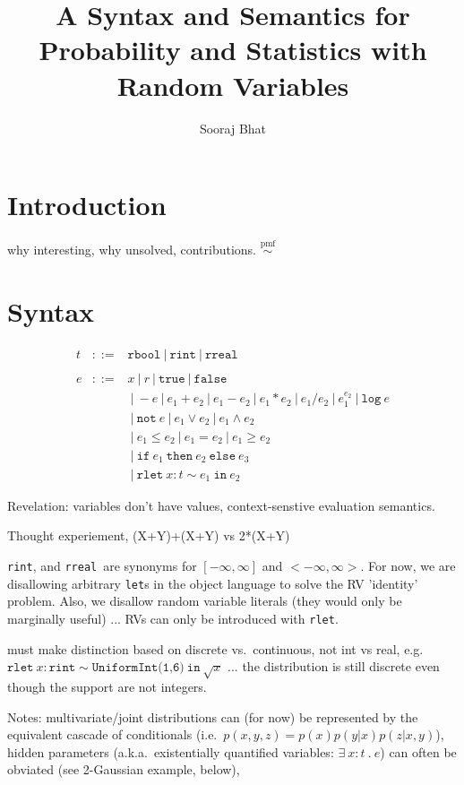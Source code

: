 \documentclass{article}
\title{A Syntax and Semantics for\\Probability and Statistics with Random Variables}
\author{Sooraj Bhat}
\newcommand{\E}[1]{\ensuremath{#1}}
\newcommand{\T}[1]{\texttt{#1}}
\newcommand{\rbool}{\T{rbool}}
\newcommand{\rint}{\T{rint}}
\newcommand{\rreal}{\T{rreal}}
\newcommand{\true}{\T{true}}
\newcommand{\false}{\T{false}}
\newcommand{\rlet}[4]{\E{\T{rlet}\ #1 : #2 \sim #3 \ \T{in}\ #4}}
\newcommand{\thereis}[3]{\E{\exists\ #1 : #2 \ . \ #3}}
\newcommand{\Not}{\T{not}}
\newcommand{\ite}[3]{\E{\T{if}\ #1\ \T{then}\ #2\ \T{else}\ #3}}
\newcommand{\tildepmf}{\E{\stackrel{\scriptscriptstyle\mathrm{pmf}}{\sim}}}
\begin{document}
\maketitle
\section{Introduction}
%
why interesting, why unsolved, contributions. \tildepmf
%
\section{Syntax}
% 
\begin{eqnarray*}
t & ::= & \rbool \ | \ \rint \ | \ \rreal \\
& & \\
e & ::= & x \ | \ r \ | \ \true \ | \ \false \\
& & \ | \ -e \ | \ e_1 + e_2 \ | \ e_1 - e_2 
    \ | \ e_1 * e_2 \ | \ e_1 / e_2 \ | \ e_1^{e_2} \ | \ \T{log}\ e \\
& & \ | \ \Not\ e \ | \ e_1 \vee e_2 \ | \ e_1 \wedge e_2 \\
& & \ | \ e_1 \leq e_2 \ | \ e_1 = e_2 \ | \ e_1 \geq e_2 \\
& & \ | \ \ite{e_1}{e_2}{e_3} \\
& & \ | \ \rlet{x}{t}{e_1}{e_2} 
\end{eqnarray*}

Revelation: variables don't have values, context-senstive evaluation semantics.

Thought experiement, (X+Y)+(X+Y) vs 2*(X+Y)

\rint, and \rreal\ are synonyms for $[-\infty,\infty]$ and
$<-\infty,\infty>$.  For now, we are disallowing arbitrary {\tt let}s
in the object language to solve the RV 'identity' problem.  Also, we
disallow random variable literals (they would only be marginally
useful) ... RVs can only be introduced with \T{rlet}.

must make distinction based on discrete vs.\ continuous, not int vs real, e.g.
\rlet{x}{\rint}{\T{UniformInt(1,6)}}{\sqrt{x}} ... the distribution is still
discrete even though the support are not integers.

Notes: multivariate/joint distributions can (for now) be represented
by the equivalent cascade of conditionals (i.e.\ $p(x,y,z) =
p(x)p(y|x)p(z|x,y)$), hidden parameters (a.k.a.\ existentially
quantified variables: \thereis{x}{t}{e}) can often be obviated (see
2-Gaussian example, below),
\end{document}
